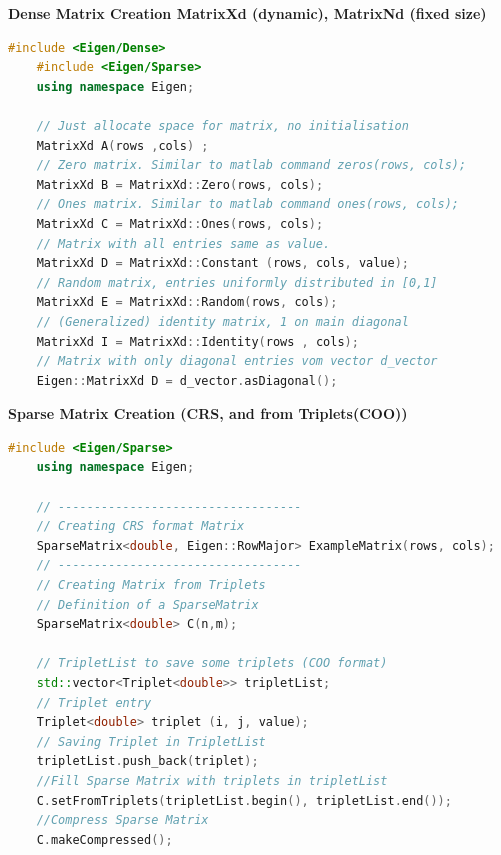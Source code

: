 \documentclass[12pt, a4paper]{article}
\begin{document}
\textbf{Dense Matrix Creation \hspace{20mm} \color{blue}MatrixXd (dynamic), MatrixNd (fixed size)}

\begin{lstlisting}[language=C++, caption=Initializing dense matrices]
	#include <Eigen/Dense>
	#include <Eigen/Sparse>
	using namespace Eigen;
	
	// Just allocate space for matrix, no initialisation
	MatrixXd A(rows ,cols) ;
	// Zero matrix. Similar to matlab command zeros(rows, cols);
	MatrixXd B = MatrixXd::Zero(rows, cols);
	// Ones matrix. Similar to matlab command ones(rows, cols);
	MatrixXd C = MatrixXd::Ones(rows, cols);
	// Matrix with all entries same as value.
	MatrixXd D = MatrixXd::Constant (rows, cols, value);
	// Random matrix, entries uniformly distributed in [0,1]
	MatrixXd E = MatrixXd::Random(rows, cols);
	// (Generalized) identity matrix, 1 on main diagonal
	MatrixXd I = MatrixXd::Identity(rows , cols);
	// Matrix with only diagonal entries vom vector d_vector
	Eigen::MatrixXd D = d_vector.asDiagonal();
\end{lstlisting}

\textbf{Sparse Matrix Creation (CRS, and from Triplets(COO))}
\begin{lstlisting}[language=C++, caption=sparse matrix creation]
	#include <Eigen/Sparse>
	using namespace Eigen;
	
	// ----------------------------------
	// Creating CRS format Matrix
	SparseMatrix<double, Eigen::RowMajor> ExampleMatrix(rows, cols); 
	// ----------------------------------
	// Creating Matrix from Triplets
	// Definition of a SparseMatrix
	SparseMatrix<double> C(n,m);

	// TripletList to save some triplets (COO format)
	std::vector<Triplet<double>> tripletList;
	// Triplet entry
	Triplet<double> triplet (i, j, value); 	 
	// Saving Triplet in TripletList
	tripletList.push_back(triplet);
	//Fill Sparse Matrix with triplets in tripletList
	C.setFromTriplets(tripletList.begin(), tripletList.end());
	//Compress Sparse Matrix
	C.makeCompressed();
\end{lstlisting}
\end{document}

